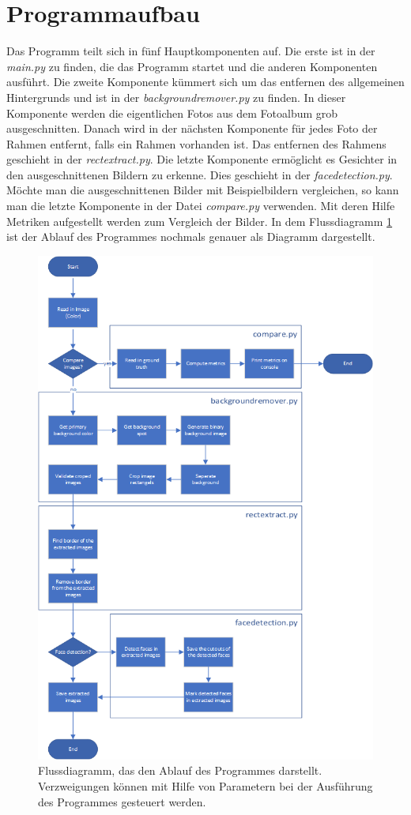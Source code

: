\section{Programmaufbau}
Das Programm teilt sich in fünf Hauptkomponenten auf. Die erste ist in der \textit{main.py} zu finden, die das Programm startet und die anderen Komponenten ausführt. Die zweite Komponente kümmert sich um das entfernen des allgemeinen Hintergrunds und ist in der \textit{backgroundremover.py} zu finden. In dieser Komponente werden die eigentlichen Fotos aus dem Fotoalbum grob ausgeschnitten. Danach wird in der nächsten Komponente für jedes Foto der Rahmen entfernt, falls ein Rahmen vorhanden ist. Das entfernen des Rahmens geschieht in der \textit{rectextract.py}. Die letzte Komponente ermöglicht es Gesichter in den ausgeschnittenen Bildern zu erkenne. Dies geschieht in der \textit{facedetection.py}. Möchte man die ausgeschnittenen Bilder mit Beispielbildern vergleichen, so kann man die letzte Komponente in der Datei \textit{compare.py} verwenden. Mit deren Hilfe Metriken aufgestellt werden zum Vergleich der Bilder. In dem Flussdiagramm \ref{fig:flowchart} ist der Ablauf des Programmes nochmals genauer als Diagramm dargestellt.

\begin{figure}[h]
	\centering
	\includegraphics[width=0.45\linewidth]{images/flowchart.png}
	\caption{Flussdiagramm, das den Ablauf des Programmes darstellt. Verzweigungen können mit Hilfe von Parametern bei der Ausführung des Programmes gesteuert werden.}
	\label{fig:flowchart}
\end{figure}
